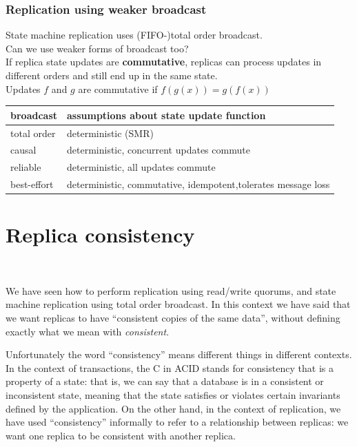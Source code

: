 \begin{frame}
    \label{s:causal-replication}
    \frametitle{Replication using weaker broadcast}
    State machine replication uses (FIFO-)total order broadcast.\\
    Can we use weaker forms of broadcast too?\\[1em]\pause
    If replica state updates are \textbf{commutative}, replicas can process updates in different orders and still end up in the same state.\\[1em]
    Updates $f$ and $g$ are commutative if $f(g(x)) = g(f(x))$\\\pause
    \renewcommand{\arraystretch}{1.3}
    \begin{tabular}{l|p{8cm}}
        \hline
        \textbf{broadcast} & \textbf{assumptions about state update function} \\\hline
        total order & deterministic (SMR) \pause\\
        causal & deterministic, concurrent updates commute \pause\\
        reliable & deterministic, all updates commute \pause\\
        best-effort & deterministic, commutative, idempotent,\newline tolerates message loss \\\hline
    \end{tabular}
\end{frame}
\label{l:causal-replication}

\section{Replica consistency}\label{sec:consistency}

\begin{frame}
    \begin{center}
        {\Large{\color{tumblue}{Replica consistency}}} \\[2em]
        \mydetails
    \end{center}
\end{frame}

We have seen how to perform replication using read/write quorums, and state machine replication using total order broadcast.
In this context we have said that we want replicas to have ``consistent copies of the same data'', without defining exactly what we mean with \emph{consistent}.

Unfortunately the word ``consistency'' means different things in different contexts.
In the context of transactions, the C in ACID stands for consistency that is a property of a state: that is, we can say that a database is in a consistent or inconsistent state, meaning that the state satisfies or violates certain invariants defined by the application.
On the other hand, in the context of replication, we have used ``consistency'' informally to refer to a relationship between replicas: we want one replica to be consistent with another replica.

